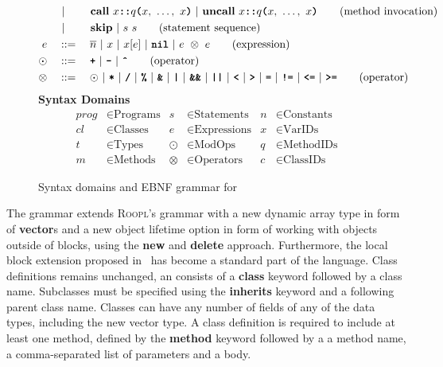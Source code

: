 \begin{figure}[h]
\begin{align}
    			&\ |\ \qquad \textbf{call}\ x\textbf{\texttt{::}}q\textbf{\texttt{(}}x,\ \dots,\ x\textbf{\texttt{)}}\ |\ \textbf{uncall}\ x\textbf{\texttt{::}}q\textbf{\texttt{(}}x,\ \dots,\ x\textbf{\texttt{)}}\tag{method invocation}\\
    			&\ |\ \qquad \textbf{skip}\ |\ s\ s\tag{statement sequence}\\
    e			\quad&::=\quad \overline{n}\ |\ x\ |\ x[e]\ |\ \textbf{\texttt{nil}}\ |\ e\ \otimes\ e\tag{expression}\\
    \odot	\quad&::=\quad \textbf{\texttt{+}}\ |\ \textbf{\texttt{-}}\ |\ \textbf{\texttt{\^}}\tag{operator}\\
    \otimes\quad&::=\quad \odot\ |\ \textbf{\texttt{*}}\ |\ \textbf{\texttt{/}}\ |\ \textbf{\texttt{\%}}\ |\ \textbf{\texttt{\&}}\ |\ \textbf{\texttt{|}}\ |\ \textbf{\texttt{\&\&}}\ |\ \textbf{\texttt{||}}\ |\ \textbf{\texttt{<}}\ |\ \textbf{\texttt{\textgreater}}\ |\ \textbf{\texttt{=}}\ |\ \textbf{\texttt{!=}}\ |\ \textbf{\texttt{<=}}\ |\ \textbf{\texttt{\textgreater=}}\tag{operator}
\end{align}
\vspace{2mm}
\textbf{Syntax Domains}
\begin{align*}
    prog &\in \text{Programs} & s &\in \text{Statements}      & n &\in \text{Constants} \\
    cl   &\in \text{Classes}  & e &\in \text{Expressions}     & x &\in \text{VarIDs}    \\
    t    &\in \text{Types}    & \odot &\in \text{ModOps}      & q &\in \text{MethodIDs} \\
    m    &\in \text{Methods}  & \otimes &\in \text{Operators} & c &\in \text{ClassIDs}
\end{align*}
\caption{Syntax domains and EBNF grammar for \rooplpp}
\label{fig:roopl-grammar}
\end{figure}

The \rooplpp grammar extends \textsc{Roopl}'s grammar with a new dynamic array type in form of \textbf{vector}s and a new object lifetime option in form of working with objects outside of blocks, using the \textbf{new} and \textbf{delete} approach. Furthermore, the local block extension proposed in~\cite{th:roopl} has become a standard part of the language. Class definitions remains unchanged, an consists of a \textbf{class} keyword followed by a class name. Subclasses must be specified using the \textbf{inherits} keyword and a following parent class name. Classes can have any number of fields of any of the data types, including the new vector type. A class definition is required to include at least one method, defined by the \textbf{method} keyword followed by a a method name, a comma-separated list of parameters and a body.

